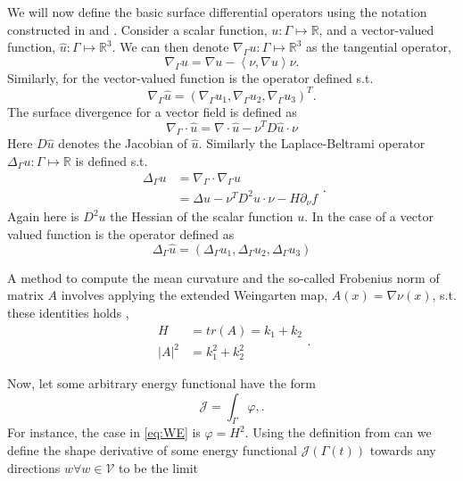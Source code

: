 We will now define the basic surface differential operators using the notation constructed in \cite{dougan2012first} and \cite{kovacs2021convergent}.
Consider a scalar function, $u: \Gamma \mapsto \mathbb{R} $, and a vector-valued function, $\hat{u}: \Gamma  \mapsto \mathbb{R} ^3$. We can then denote $ \nabla _{\Gamma } u: \Gamma \mapsto \mathbb{R} ^{3}$ as the tangential operator,
$$
\nabla_{\Gamma
} u  = \nabla u - \left<\nu, \nabla u \right> \nu.
$$
Similarly, for the vector-valued function is the operator defined s.t.
$$\nabla_{\Gamma } \hat{u} = \left( \nabla_{\Gamma } u_{1},\nabla_{\Gamma } u_{2},\nabla_{\Gamma } u_{3}   \right)^{T}.$$ The surface divergence for a vector field is defined as \[
\nabla_{\Gamma } \cdot \hat{u} = \nabla  \cdot \hat{u} - \nu^{T} D \hat{u} \cdot \nu
\]
Here $D\hat{u}$ denotes the Jacobian of $\hat{u}$. Similarly  the Laplace-Beltrami operator $\Delta _{\Gamma }u: \Gamma \mapsto \mathbb{R}$ is defined s.t.
\begin{equation*}
    \begin{split}
 \Delta _{\Gamma } u  & = \nabla _{\Gamma } \cdot  \nabla _{\Gamma }u \\
 &=  \Delta u  - \nu ^{T} D^2 u \cdot \nu - H \partial _{\nu } f
    \end{split}
.\end{equation*}
Again here is $D^2u$ the Hessian of the scalar function $u$. In the case of a vector valued function is the operator defined as \[
\Delta _{\Gamma } \hat{u} = \left( \Delta _{\Gamma } u_{1}, \Delta _{\Gamma } u_{2}, \Delta _{\Gamma } u_{3} \right)
\]

A method to compute the mean curvature and the so-called Frobenius norm of matrix $A$ involves applying the
extended Weingarten map, $ A\left( x \right) = \nabla \nu \left( x \right) $, s.t. these identities holds \cite{kovacs2021convergent},
\begin{equation*}
    \begin{split}
    H & = tr(A) = k_{1} + k_{2} \\
    \left\lvert A \right\rvert^{2}  & = k_{1}^2 + k_{2}^2
    \end{split}
.\end{equation*}

Now, let some arbitrary energy functional have the form
\[
\mathcal{J} = \int_{\Gamma }^{} \varphi,.
\]
For instance, the case in \eqref{eq:WE} is $\varphi = H ^2$.
Using the definition from \cite{bonito2010parametric, troltzsch2010optimal} can we define the shape derivative of some energy
functional $\mathcal{J} \left( \Gamma \left( t \right)  \right)  $ towards any directions $ w \forall w \in \mathcal{V}  $  to be the limit

